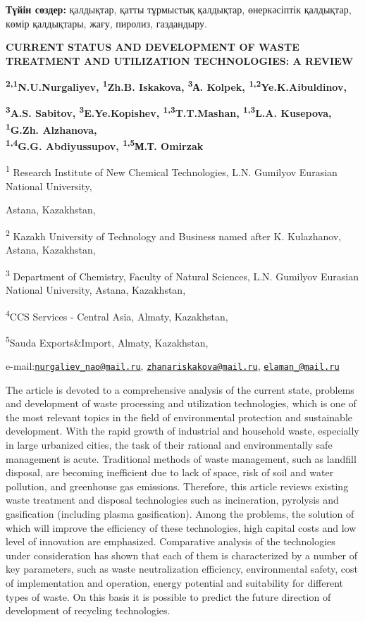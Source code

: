 {\bfseries Түйін сөздер:} қалдықтар, қатты тұрмыстық қалдықтар,
өнеркәсіптік қалдықтар, көмір қалдықтары, жағу, пиролиз, газдандыру.

{\bfseries CURRENT STATUS AND DEVELOPMENT OF WASTE TREATMENT AND
UTILIZATION TECHNOLOGIES: A REVIEW}

{\bfseries \textsuperscript{2,1}N.U.Nurgaliyev\textsuperscript{\envelope },
\textsuperscript{1}Zh.B. Iskakova\textsuperscript{\envelope },
\textsuperscript{3}А. Kolpek,
\textsuperscript{1,2}Ye.K.Aibuldinov\textsuperscript{\envelope },}

{\bfseries \textsuperscript{3}A.S. Sabitov,
\textsuperscript{3}E.Ye.Kopishev, \textsuperscript{1,3}T.T.Mashan,
\textsuperscript{1,3}L.A. Kusepova, \textsuperscript{1}G.Zh.
Alzhanova,\\
\textsuperscript{1,4}G.G. Abdiyussupov, \textsuperscript{1,5}М.Т.
Omirzak}

\textsuperscript{1} Research Institute of New Chemical Technologies,
L.N. Gumilyov Eurasian National University,

Astana, Kazakhstan,

\textsuperscript{2} Kazakh University of Technology and Business named
after K. Kulazhanov, Astana, Kazakhstan,

\textsuperscript{3} Department of Chemistry, Faculty of Natural
Sciences, L.N. Gumilyov Eurasian National University, Astana,
Kazakhstan,

\textsuperscript{4}CCS Services - Central Asia, Almaty, Kazakhstan,

\textsuperscript{5}Sauda Exports\&Import, Almaty, Kazakhstan,

e-mail:\href{mailto:nurgaliev_nao@mail.ru}{\nolinkurl{nurgaliev\_nao@mail.ru}},
\href{mailto:zhanariskakova@mail.ru}{\nolinkurl{zhanariskakova@mail.ru}},
\href{mailto:elaman_@mail.ru}{\nolinkurl{elaman\_@mail.ru}}

The article is devoted to a comprehensive analysis of the current state,
problems and development of waste processing and utilization
technologies, which is one of the most relevant topics in the field of
environmental protection and sustainable development. With the rapid
growth of industrial and household waste, especially in large urbanized
cities, the task of their rational and environmentally safe management
is acute. Traditional methods of waste management, such as landfill
disposal, are becoming inefficient due to lack of space, risk of soil
and water pollution, and greenhouse gas emissions. Therefore, this
article reviews existing waste treatment and disposal technologies such
as incineration, pyrolysis and gasification (including plasma
gasification). Among the problems, the solution of which will improve
the efficiency of these technologies, high capital costs and low level
of innovation are emphasized. Comparative analysis of the technologies
under consideration has shown that each of them is characterized by a
number of key parameters, such as waste neutralization efficiency,
environmental safety, cost of implementation and operation, energy
potential and suitability for different types of waste. On this basis it
is possible to predict the future direction of development of recycling
technologies.

